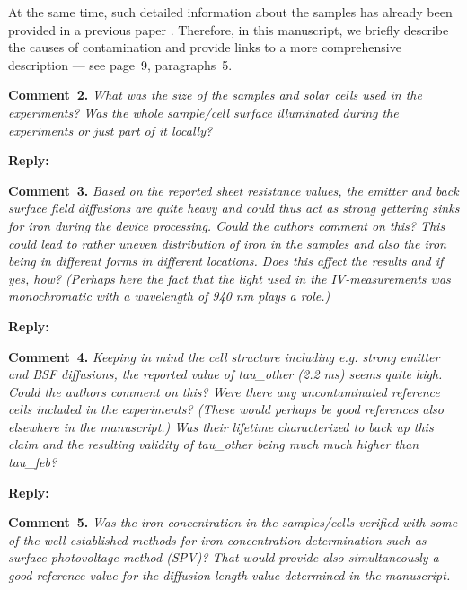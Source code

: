 \documentclass{WileyMSP-template}
\begin{document}
At the same time, such detailed information about the samples has already been provided in a previous paper \cite{Olikh2021JAP}.
Therefore, in this manuscript, we briefly describe the causes of contamination and provide links
to a more comprehensive description --- see page~9, paragraphs~5.


\vspace{1cm}
\noindent
\textcolor[rgb]{0.00,0.50,1.00}{\textbf{Comment~2.}}
\emph{What was the size of the samples and solar cells used in the experiments?
Was the whole sample/cell surface illuminated during the experiments or just part of it locally?}

\noindent
\textcolor[rgb]{0.51,0.00,0.00}{\textbf{Reply:}}



\vspace{1cm}
\noindent
\textcolor[rgb]{0.00,0.50,1.00}{\textbf{Comment~3.}}
\emph{Based on the reported sheet resistance values,
the emitter and back surface field diffusions are quite heavy and could thus act as strong gettering sinks for iron during the device processing.
Could the authors comment on this?
This could lead to rather uneven distribution of iron in the samples and also the iron being in different forms in different locations.
Does this affect the results and if yes, how?
(Perhaps here the fact that the light used in the IV-measurements was monochromatic with a wavelength of 940 nm plays a role.)}

\noindent
\textcolor[rgb]{0.51,0.00,0.00}{\textbf{Reply:}}


\vspace{1cm}
\noindent
\textcolor[rgb]{0.00,0.50,1.00}{\textbf{Comment~4.}}
\emph{Keeping in mind the cell structure including e.g. strong emitter and BSF diffusions,
the reported value of tau\_other (2.2 ms) seems quite high.
Could the authors comment on this?
Were there any uncontaminated reference cells included in the experiments?
(These would perhaps be good references also elsewhere in the manuscript.)
Was their lifetime characterized to back up this claim and the resulting validity of tau\_other being much much higher than tau\_feb?
}



\noindent
\textcolor[rgb]{0.51,0.00,0.00}{\textbf{Reply:}}


\vspace{1cm}
\noindent
\textcolor[rgb]{0.00,0.50,1.00}{\textbf{Comment~5.}}
\emph{
Was the iron concentration in the samples/cells verified with some of the well-established methods
for iron concentration determination such as surface photovoltage method (SPV)?
That would provide also simultaneously a good reference value for the diffusion length value determined in the manuscript.
}
\end{document}
